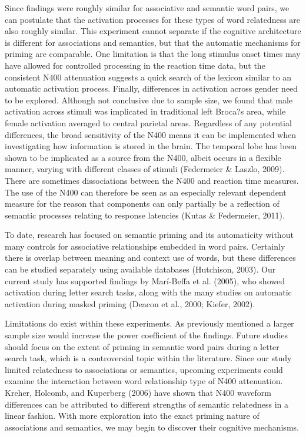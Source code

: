 \documentclass[english,man]{apa6}
\theoremstyle{definition}
\theoremstyle{definition}
\theoremstyle{remark}
\begin{document}
Since findings were roughly similar for associative and semantic word
pairs, we can postulate that the activation processes for these types of
word relatedness are also roughly similar. This experiment cannot
separate if the cognitive architecture is different for associations and
semantics, but that the automatic mechanisms for priming are comparable.
One limitation is that the long stimulus onset times may have allowed
for controlled processing in the reaction time data, but the consistent
N400 attenuation suggests a quick search of the lexicon similar to an
automatic activation process. Finally, differences in activation across
gender need to be explored. Although not conclusive due to sample size,
we found that male activation across stimuli was implicated in
traditional left Broca?s area, while female activation averaged to
central parietal areas. Regardless of any potential differences, the
broad sensitivity of the N400 means it can be implemented when
investigating how information is stored in the brain. The temporal lobe
has been shown to be implicated as a source from the N400, albeit occurs
in a flexible manner, varying with different classes of stimuli
(Federmeier \& Laszlo, 2009). There are sometimes dissociations between
the N400 and reaction time measures. The use of the N400 can therefore
be seen as an especially relevant dependent measure for the reason that
components can only partially be a reflection of semantic processes
relating to response latencies (Kutas \& Federmeier, 2011).

To date, research has focused on semantic priming and its automaticity
without many controls for associative relationships embedded in word
pairs. Certainly there is overlap between meaning and context use of
words, but these differences can be studied separately using available
databases (Hutchison, 2003). Our current study has supported findings by
Marí-Beffa et al. (2005), who showed activation during letter search
tasks, along with the many studies on automatic activation during masked
priming (Deacon et al., 2000; Kiefer, 2002).

Limitations do exist within these experiments. As previously mentioned a
larger sample size would increase the power coefficient of the findings.
Future studies should focus on the extent of priming in semantic word
pairs during a letter search task, which is a controversial topic within
the literature. Since our study limited relatedness to associations or
semantics, upcoming experiments could examine the interaction between
word relationship type of N400 attenuation. Kreher, Holcomb, and
Kuperberg (2006) have shown that N400 waveform differences can be
attributed to different strengths of semantic relatedness in a linear
fashion. With more exploration into the exact priming nature of
associations and semantics, we may begin to discover their cognitive
mechanisms.
\end{document}
